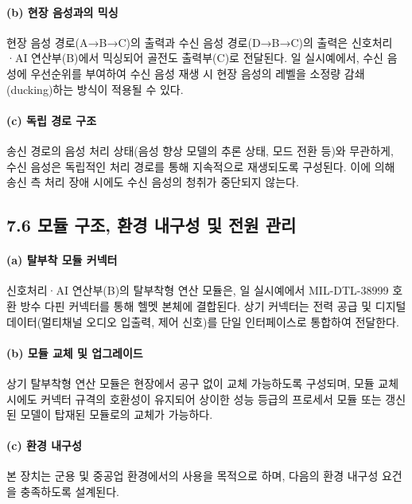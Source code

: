 \documentclass{article}
\begin{document}
\paragraph{(b) 현장 음성과의 믹싱}

현장 음성 경로(A→B→C)의 출력과 수신 음성 경로(D→B→C)의 출력은 신호처리·AI 연산부(B)에서 믹싱되어 골전도 출력부(C)로 전달된다. 일 실시예에서, 수신 음성에 우선순위를 부여하여 수신 음성 재생 시 현장 음성의 레벨을 소정량 감쇄(ducking)하는 방식이 적용될 수 있다.

\paragraph{(c) 독립 경로 구조}

송신 경로의 음성 처리 상태(음성 향상 모델의 추론 상태, 모드 전환 등)와 무관하게, 수신 음성은 독립적인 처리 경로를 통해 지속적으로 재생되도록 구성된다. 이에 의해 송신 측 처리 장애 시에도 수신 음성의 청취가 중단되지 않는다.

\subsection{7.6 모듈 구조, 환경 내구성 및 전원 관리}

\paragraph{(a) 탈부착 모듈 커넥터}

신호처리·AI 연산부(B)의 탈부착형 연산 모듈은, 일 실시예에서 MIL-DTL-38999 호환 방수 다핀 커넥터를 통해 헬멧 본체에 결합된다. 상기 커넥터는 전력 공급 및 디지털 데이터(멀티채널 오디오 입출력, 제어 신호)를 단일 인터페이스로 통합하여 전달한다.

\paragraph{(b) 모듈 교체 및 업그레이드}

상기 탈부착형 연산 모듈은 현장에서 공구 없이 교체 가능하도록 구성되며, 모듈 교체 시에도 커넥터 규격의 호환성이 유지되어 상이한 성능 등급의 프로세서 모듈 또는 갱신된 모델이 탑재된 모듈로의 교체가 가능하다.

\paragraph{(c) 환경 내구성}

본 장치는 군용 및 중공업 환경에서의 사용을 목적으로 하며, 다음의 환경 내구성 요건을 충족하도록 설계된다.
\end{document}

